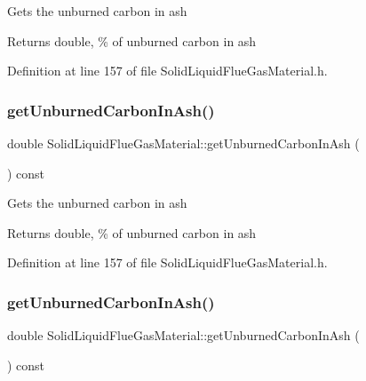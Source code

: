 Gets the unburned carbon in ash \begin{DoxyReturn}{Returns}
double, \% of unburned carbon in ash 
\end{DoxyReturn}


Definition at line 157 of file Solid\+Liquid\+Flue\+Gas\+Material.\+h.

\mbox{\label{class_solid_liquid_flue_gas_material_a53ac34a949168a35297ab3afb9eb2c7b}} 
\subsubsection{\texorpdfstring{get\+Unburned\+Carbon\+In\+Ash()}{getUnburnedCarbonInAsh()}\hspace{0.1cm}{\footnotesize\ttfamily [2/3]}}
{\footnotesize\ttfamily double Solid\+Liquid\+Flue\+Gas\+Material\+::get\+Unburned\+Carbon\+In\+Ash (\begin{DoxyParamCaption}{ }\end{DoxyParamCaption}) const\hspace{0.3cm}{\ttfamily [inline]}}

Gets the unburned carbon in ash \begin{DoxyReturn}{Returns}
double, \% of unburned carbon in ash 
\end{DoxyReturn}


Definition at line 157 of file Solid\+Liquid\+Flue\+Gas\+Material.\+h.

\mbox{\label{class_solid_liquid_flue_gas_material_a53ac34a949168a35297ab3afb9eb2c7b}} 
\subsubsection{\texorpdfstring{get\+Unburned\+Carbon\+In\+Ash()}{getUnburnedCarbonInAsh()}\hspace{0.1cm}{\footnotesize\ttfamily [3/3]}}
{\footnotesize\ttfamily double Solid\+Liquid\+Flue\+Gas\+Material\+::get\+Unburned\+Carbon\+In\+Ash (\begin{DoxyParamCaption}{ }\end{DoxyParamCaption}) const\hspace{0.3cm}{\ttfamily [inline]}}

